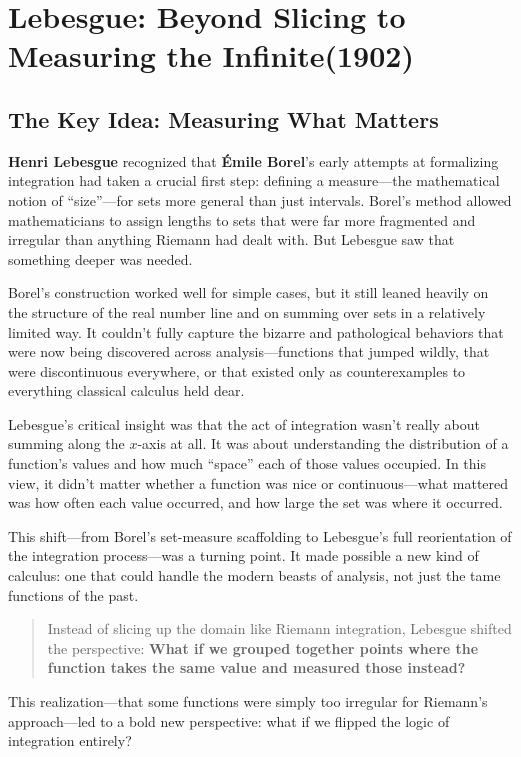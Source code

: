 \section{Lebesgue: Beyond Slicing to Measuring the Infinite(1902)}


\subsection{The Key Idea: Measuring What Matters}

\textbf{Henri Lebesgue} recognized that \textbf{Émile Borel}’s early attempts at formalizing integration had taken a crucial first step: defining a measure—the mathematical notion of “size”—for sets more general than just intervals. Borel's method allowed mathematicians to assign lengths to sets that were far more fragmented and irregular than anything Riemann had dealt with. But Lebesgue saw that something deeper was needed.

Borel’s construction worked well for simple cases, but it still leaned heavily on the structure of the real number line and on summing over sets in a relatively limited way. It couldn't fully capture the bizarre and pathological behaviors that were now being discovered across analysis—functions that jumped wildly, that were discontinuous everywhere, or that existed only as counterexamples to everything classical calculus held dear.

Lebesgue’s critical insight was that the act of integration wasn’t really about summing along the \( x \)-axis at all. It was about understanding the distribution of a function’s values and how much “space” each of those values occupied. In this view, it didn’t matter whether a function was nice or continuous—what mattered was how often each value occurred, and how large the set was where it occurred.

This shift—from Borel’s set-measure scaffolding to Lebesgue’s full reorientation of the integration process—was a turning point. It made possible a new kind of calculus: one that could handle the modern beasts of analysis, not just the tame functions of the past.

\begin{quote}
Instead of slicing up the domain like Riemann integration, Lebesgue shifted the perspective: \textbf{What if we grouped together points where the function takes the same value and measured those instead?}
\end{quote}

This realization—that some functions were simply too irregular for Riemann’s approach—led to a bold new perspective: what if we flipped the logic of integration entirely?

